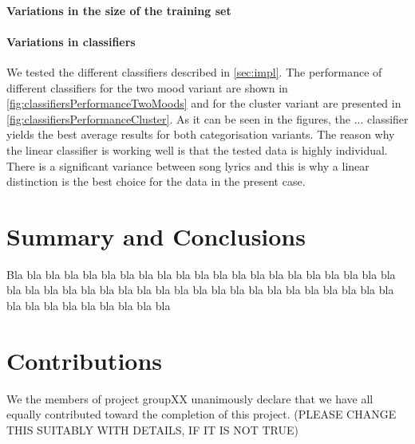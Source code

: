 \documentclass[a4paper,12pt]{article}
\begin{document}
\paragraph{Variations in the size of the training set} 

\paragraph{Variations in classifiers} We tested the different classifiers described in \ref{sec:impl}. The performance of different classifiers for the two mood variant are shown in \ref{fig:classifiersPerformanceTwoMoods} and for the cluster variant are presented in \ref{fig:classifiersPerformanceCluster}. As it can be seen in the figures, the ... classifier yields the best average results for both categorisation variants. The reason why the linear classifier is working well is that the tested data is highly individual. There is a significant variance between song lyrics and this is why a linear distinction is the best choice for the data in the present case.

 

 

\section{Summary and Conclusions}
\label{sec:summary}

Bla bla bla bla bla bla bla bla bla bla bla bla bla bla bla bla bla 
bla bla bla bla bla bla bla bla bla bla bla bla bla bla bla bla bla 
bla bla bla bla bla bla bla bla bla bla bla bla bla bla bla bla bla 


\section{Contributions}
\label{sec:contributions}
We the members of project groupXX unanimously declare that 
we have all equally contributed toward the completion of this
project. (PLEASE CHANGE THIS SUITABLY WITH DETAILS, IF IT IS NOT TRUE)




\end{document}
